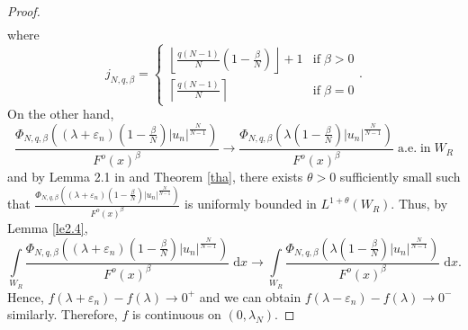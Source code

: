 \documentclass[11pt]{article}
\theoremstyle{plain}
\numberwithin{equation}{section}
\begin{document}
\begin{proof}
\begin{align}
\end{align}
where
$$
j_{N,q,\beta}=\left\{\begin{array}{cc}
\left\lfloor\frac{q(N-1)}{N}(1-\frac{\beta}{N})\right\rfloor+1 & {\mathrm{if}}\;\beta>0 \\
\left\lceil\frac{q(N-1)}{N}\right\rceil & {\mathrm{if}}\;\beta=0
\end{array}\right..
$$
On the other hand,
$$
\frac{\Phi_{N,q,\beta}((\lambda+\varepsilon_{n})(1-\frac{\beta}{N})\lvert u_{n}\rvert^{\frac{N}{N-1}})}{F^{o}(x)^{\beta}}\rightarrow\frac{\Phi_{N,q,\beta}(\lambda(1-\frac{\beta}{N})\lvert u_{n}\rvert^{\frac{N}{N-1}})}{F^{o}(x)^{\beta}}\;\mathrm{a.e.}\;\mathrm{in}\;W_{R}
$$
and by Lemma 2.1 in \cite{Yang-2012} and Theorem \ref{tha}, there exists $\theta>0$ sufficiently small such that $\frac{\Phi_{N,q,\beta}((\lambda+\varepsilon_{n})(1-\frac{\beta}{N})\lvert u_{n}\rvert^{\frac{N}{N-1}})}{F^{o}(x)^{\beta}}$ is uniformly bounded in $L^{1+\theta}(W_{R})$. Thus, by Lemma \ref{le2.4},
$$
\int\limits_{W_{R}}\frac{\Phi_{N,q,\beta}((\lambda+\varepsilon_{n})(1-\frac{\beta}{N})\lvert u_{n}\rvert^{\frac{N}{N-1}})}{F^{o}(x)^{\beta}}\;\mathrm{d}x\rightarrow\int\limits_{W_{R}}\frac{\Phi_{N,q,\beta}(\lambda(1-\frac{\beta}{N})\lvert u_{n}\rvert^{\frac{N}{N-1}})}{F^{o}(x)^{\beta}}\;\mathrm{d}x.
$$
Hence, $f(\lambda+\varepsilon_{n})-f(\lambda)\rightarrow0^{+}$ and we can obtain $f(\lambda-\varepsilon_{n})-f(\lambda)\rightarrow0^{-}$ similarly. Therefore, $f$ is continuous on $(0,\lambda_{N})$.
\end{proof}
\end{document}
